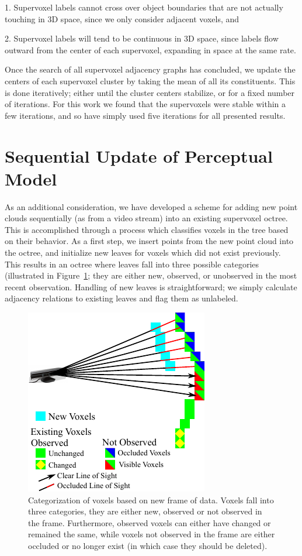 1. Supervoxel labels cannot cross over object boundaries that are not actually touching in 3D space, since we only consider adjacent voxels, and 

2. Supervoxel labels will tend to be continuous in 3D space, since labels flow outward from the center of each supervoxel, expanding in space at the same rate.

Once the search of all supervoxel adjacency graphs has concluded, we update the centers of each supervoxel cluster by taking the mean of all its constituents. This is done iteratively; either until the cluster centers stabilize, or for a fixed number of iterations. For this work we found that the supervoxels were stable within a few iterations, and so have simply used five iterations for all presented results. 

\section{Sequential Update of Perceptual Model}
As an additional consideration, we have developed a scheme for adding new point clouds sequentially (as from a video stream) into an existing supervoxel octree. This is accomplished through a process which classifies voxels in the tree based on their behavior. As a first step, we insert points from the new point cloud into the octree, and initialize new leaves for voxels which did not exist previously. This results in an octree where leaves fall into three possible categories (illustrated in Figure~\ref{fig:VoxelVisibility}; they are either new, observed, or unobserved in the most recent observation. Handling of new leaves is straightforward; we simply calculate adjacency relations to existing leaves and flag them as unlabeled. 
\begin{figure}
  \centering
  \includegraphics[scale=1.5]{figures/IROS2013/VoxelVisibility.pdf}
  \caption[Voxel Visibility]{Categorization of voxels based on new frame of data. Voxels fall into three categories, they are either new, observed or not observed in the frame. Furthermore, observed voxels can either have changed or remained the same, while voxels not observed in the frame are either occluded or no longer exist (in which case they should be deleted).}
  \label{fig:VoxelVisibility}
\end{figure}

